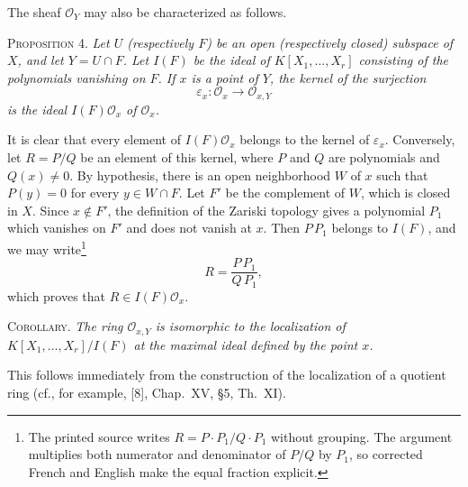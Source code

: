 The sheaf $\mathcal{O}_Y$ may also be characterized as follows.

\label{fac:II:1:no:31:prop:4}
\textsc{Proposition 4.} \textit{Let $U$ (respectively $F$) be an open (respectively closed) subspace of $X$, and let $Y=U\cap F$. Let $I(F)$ be the ideal of $K[X_1,\ldots,X_r]$ consisting of the polynomials vanishing on $F$. If $x$ is a point of $Y$, the kernel of the surjection}
\[
\varepsilon_x:\mathcal{O}_x\longrightarrow\mathcal{O}_{x,Y}
\]
\textit{is the ideal $I(F)\mathcal{O}_x$ of $\mathcal{O}_x$.}

It is clear that every element of $I(F)\mathcal{O}_x$ belongs to the kernel of $\varepsilon_x$. Conversely, let $R=P/Q$ be an element of this kernel, where $P$ and $Q$ are polynomials and $Q(x)\neq0$. By hypothesis, there is an open neighborhood $W$ of $x$ such that $P(y)=0$ for every $y\in W\cap F$. Let $F'$ be the complement of $W$, which is closed in $X$. Since $x\notin F'$, the definition of the Zariski topology gives a polynomial $P_1$ which vanishes on $F'$ and does not vanish at $x$. Then $P\,P_1$ belongs to $I(F)$, and we may write\footnote{The printed source writes $R=P\cdot P_1/Q\cdot P_1$ without grouping. The argument multiplies both numerator and denominator of $P/Q$ by $P_1$, so corrected French and English make the equal fraction explicit.}
\[
R=\frac{P\,P_1}{Q\,P_1},
\]
which proves that $R\in I(F)\mathcal{O}_x$.

\label{fac:II:1:no:31:cor:prop:4}
\textsc{Corollary.} \textit{The ring $\mathcal{O}_{x,Y}$ is isomorphic to the localization of $K[X_1,\ldots,X_r]/I(F)$ at the maximal ideal defined by the point $x$.}

This follows immediately from the construction of the localization of a quotient ring (cf., for example, [8], Chap.~XV, \S5, Th.~XI).
